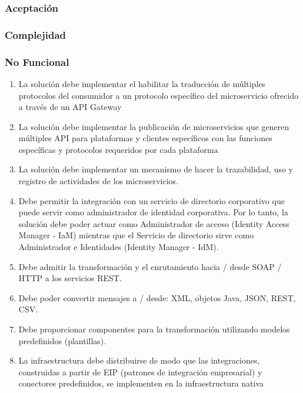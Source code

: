 \documentclass[
  paper=a4,
  ,captions=tableheading
]{scrartcl}
\providecommand{\tightlist}{%
  \setlength{\itemsep}{0pt}\setlength{\parskip}{0pt}}
\begin{document}
\hypertarget{aceptaciuxf3n}{%
\subsubsection{Aceptación}\label{aceptaciuxf3n}}

\hypertarget{complejidad}{%
\subsubsection{Complejidad}\label{complejidad}}

\hypertarget{no-funcional}{%
\subsubsection{No Funcional}\label{no-funcional}}

\begin{enumerate}
\def\labelenumi{\arabic{enumi}.}
\tightlist
\item
  La solución debe implementar el habilitar la traducción de múltiples
  protocolos del consumidor a un protocolo específico del microservicio
  ofrecido a través de un API Gateway
\item
  La solución debe implementar la publicación de microservicios que
  generen múltiples API para plataformas y clientes específicos con las
  funciones específicas y protocolos requeridos por cada plataforma
\item
  La solución debe implementar un mecanismo de hacer la trazabilidad,
  uso y registro de actividades de los microservicios.
\item
  Debe permitir la integración con un servicio de directorio corporativo
  que puede servir como administrador de identidad corporativa. Por lo
  tanto, la solución debe poder actuar como Administrador de acceso
  (Identity Access Manager - IaM) mientras que el Servicio de directorio
  sirve como Administrador e Identidades (Identity Manager - IdM).
\item
  Debe admitir la transformación y el enrutamiento hacia / desde SOAP /
  HTTP a los servicios REST.
\item
  Debe poder convertir mensajes a / desde: XML, objetos Java, JSON,
  REST, CSV.
\item
  Debe proporcionar componentes para la transformación utilizando
  modelos predefinidos (plantillas).
\item
  La infraestructura debe distribuirse de modo que las integraciones,
  construidas a partir de EIP (patrones de integración empresarial) y
  conectores predefinidos, se implementen en la infraestructura nativa

\end{enumerate}
\end{document}
